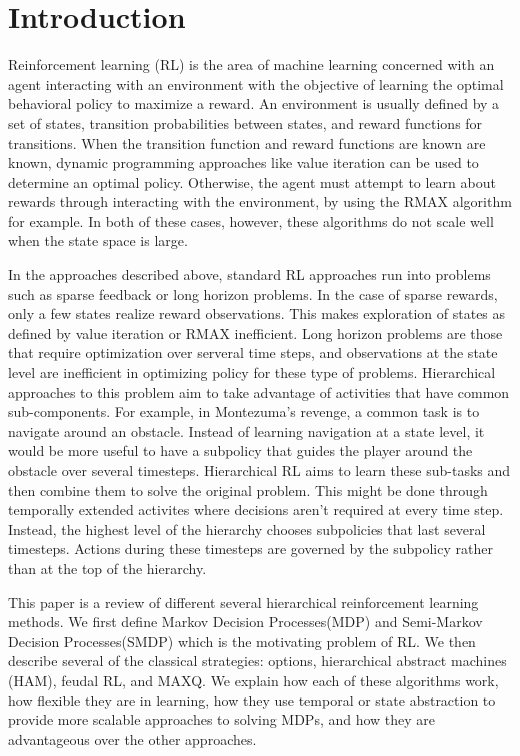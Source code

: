 \section{Introduction}

Reinforcement learning (RL) is the area of machine learning concerned with an agent interacting with an environment with the objective of learning the optimal behavioral policy to maximize a reward. An environment is usually defined by a set of states, transition probabilities between states, and reward functions for transitions. When the transition function and reward functions are known are known, dynamic programming approaches like value iteration can be used to determine an optimal policy. Otherwise, the agent must attempt to learn about rewards through interacting with the environment, by using the RMAX algorithm for example. In both of these cases, however, these algorithms do not scale well when the state space is large. 

In the approaches described above, standard RL approaches run into problems such as sparse feedback or long horizon problems. In the case of sparse rewards, only a few states realize reward observations. This makes exploration of states as defined by value iteration or RMAX inefficient. Long horizon problems are those that require optimization over serveral time steps, and observations at the state level are inefficient in optimizing policy for these type of problems. Hierarchical approaches to this problem aim to take advantage of activities that have common sub-components. For example, in Montezuma's revenge, a common task is to navigate around an obstacle. Instead of learning navigation at a state level, it would be more useful to have a subpolicy that guides the player around the obstacle over several timesteps.  Hierarchical RL aims to learn these sub-tasks and then combine them to solve the original problem. This might be done through temporally extended activites where decisions aren't required at every time step. Instead, the highest level of the hierarchy chooses subpolicies that last several timesteps. Actions during these timesteps are governed by the subpolicy rather than at the top of the hierarchy.   

This paper is a review of different several hierarchical reinforcement learning methods. We first define Markov Decision Processes(MDP) and Semi-Markov Decision Processes(SMDP) which is the motivating problem of RL. We then describe several of the classical strategies: options, hierarchical abstract machines (HAM), feudal RL, and MAXQ. We explain how each of these algorithms work, how flexible they are in learning, how they use temporal or state abstraction to provide more scalable approaches to solving MDPs, and how they are advantageous over the other approaches. 

